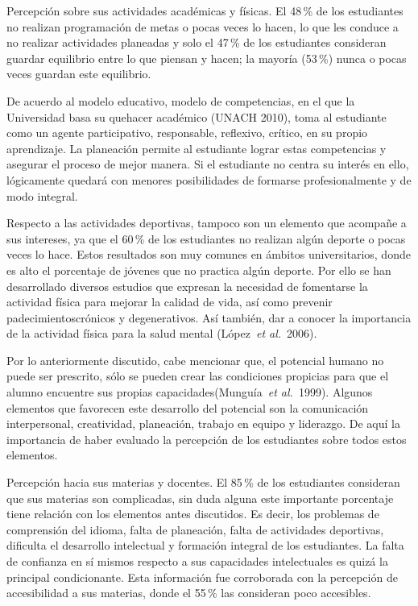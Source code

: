 Percepción sobre sus actividades académicas y físicas. El 48\,\% de los
estudiantes no realizan programación de metas o pocas veces lo hacen, lo
que les conduce a no realizar actividades planeadas y solo el 47\,\% de los
estudiantes consideran guardar equilibrio entre lo que piensan y hacen; la
mayoría (53\,\%) nunca o pocas veces guardan este equilibrio.

 
De acuerdo al modelo educativo, modelo de competencias, en el que la
Universidad basa su quehacer académico (UNACH 2010), toma al estudiante
como un agente participativo, responsable, reflexivo, crítico, en su propio
aprendizaje. La planeación permite al estudiante lograr estas competencias
y asegurar el proceso de mejor manera. Si el estudiante no centra su
interés en ello, lógicamente quedará con menores posibilidades de formarse
profesionalmente y de modo integral.

 
Respecto a las actividades deportivas, tampoco son un elemento que acompañe
a sus intereses, ya que el 60\,\% de los estudiantes no realizan algún
deporte o pocas veces lo hace. Estos resultados son muy comunes en ámbitos
universitarios, donde es alto el porcentaje de jóvenes que no practica
algún deporte. Por ello se han desarrollado diversos estudios que expresan
la necesidad de fomentarse la actividad física para mejorar la calidad de
vida, así como prevenir padecimientos\linebreak crónicos y degenerativos. Así
también, dar a conocer la importancia de la actividad física para la salud
mental (López~\textit{et al.}~2006).

 
Por lo anteriormente discutido, cabe mencionar que, el potencial humano no
puede ser prescrito, sólo se pueden crear las condiciones propicias para
que el alumno encuentre sus propias capacidades\linebreak (Munguía~\textit{et al.}~1999).
Algunos elementos que favorecen este desarrollo del potencial son la
comunicación interpersonal, creatividad, planeación, trabajo en equipo y
liderazgo. De aquí la importancia de haber evaluado la percepción de los
estudiantes sobre todos estos elementos.

 
Percepción hacia sus materias y docentes. El 85\,\% de los estudiantes
consideran que sus materias son complicadas, sin duda alguna este
importante porcentaje tiene relación con los elementos antes discutidos. Es
decir, los problemas de comprensión del idioma, falta de planeación, falta
de actividades deportivas, dificulta el desarrollo intelectual y formación
integral de los estudiantes.  La falta de confianza en sí mismos respecto a
sus capacidades intelectuales es quizá la principal condicionante. Esta
información fue corroborada con la percepción de accesibilidad a sus
materias, donde el 55\,\% las consideran poco accesibles.

